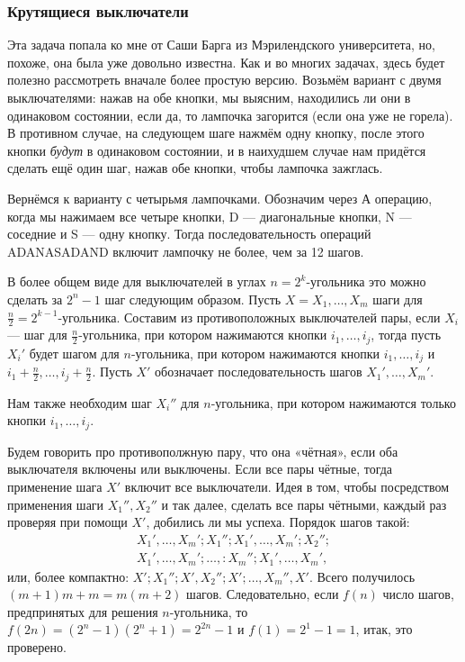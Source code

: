 \subsubsection*{Крутящиеся выключатели}%

Эта задача попала ко мне от Саши Барга из Мэрилендского университета, но, похоже, она была уже довольно известна.
Как и во многих задачах, здесь будет полезно рассмотреть вначале более простую версию.
Возьмём вариант с двумя выключателями: нажав на обе кнопки, мы выясним, находились ли они в одинаковом состоянии, если да, то лампочка загорится (если она уже не горела).
В противном случае, на следующем шаге нажмём одну кнопку, после этого кнопки \emph{будут} в одинаковом состоянии, и в наихудшем случае нам придётся сделать ещё один шаг, нажав обе кнопки, чтобы лампочка зажглась.

Вернёмся к варианту с четырьмя лампочками.
Обозначим через 
А операцию, когда мы нажимаем все четыре кнопки, 
D --- диагональные кнопки, 
N --- соседние и 
S --- одну кнопку.
Тогда последовательность операций ADANASADAND включит лампочку не более, чем за 12 шагов.

В более общем виде для выключателей в углах $n=2^k$-угольника это можно сделать за $2^n-1$ шаг следующим образом.
Пусть $X=X_1,\dots,X_m$ шаги для $\tfrac n2=2^{k-1}$-угольника.
Составим из противоположных выключателей пары, если $X_i$ --- шаг для $\tfrac n2$-угольника, при котором нажимаются кнопки $i_1,\dots,i_j$, тогда пусть $X_i'$ будет шагом для $n$-угольника, при котором нажимаются кнопки $i_1,\dots,i_j$ и $i_1+\tfrac n2,\dots,i_j+\tfrac n2$.
Пусть $X'$ обозначает последовательность шагов $X_1',\dots,X_m'$.

Нам также необходим шаг $X_i''$ для $n$-угольника, при котором нажимаются только кнопки $i_1,\dots,i_j$.

Будем говорить про противополжную пару, что она «чётная», если оба выключателя включены или выключены.
Если все пары чётные, тогда применение шага $X'$ включит все выключатели.
Идея в том, чтобы посредством применения шаги $X_1'',X_2''$ и так далее, сделать все пары чётными, каждый раз проверяя при помощи $X'$, добились ли мы успеха.
Порядок шагов такой:
\begin{align*}
X_1',\dots,X_m';X_1'';X_1',\dots,X_m';X_2'';
\\
X_1',\dots,X_m';\dots,:X_m'';X_1',\dots,X_m',
\end{align*}
или, более компактно: $X';X_1'';X',X_2'';X';\dots,X_m'',X'$.
Всего получилось $(m+1)m+m=m(m+2)$ шагов.
Следовательно, если $f(n)$ число шагов, предпринятых для решения $n$-угольника, то $f(2n)=(2^n-1)(2^n+1)=2^{2n}-1$ и $f(1)=2^1-1=1$, итак, это проверено.

